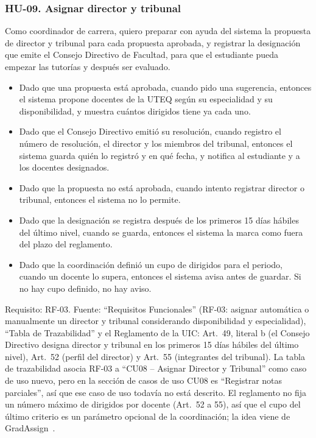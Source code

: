 \subsubsection*{HU-09. Asignar director y tribunal}
Como coordinador de carrera, quiero preparar con ayuda del sistema la propuesta de director y tribunal para cada propuesta aprobada, y registrar la designación que emite el Consejo Directivo de Facultad, para que el estudiante pueda empezar las tutorías y después ser evaluado.
\begin{itemize}
  \item Dado que una propuesta está aprobada, cuando pido una sugerencia, entonces el sistema propone docentes de la UTEQ según su especialidad y su disponibilidad, y muestra cuántos dirigidos tiene ya cada uno.
  \item Dado que el Consejo Directivo emitió su resolución, cuando registro el número de resolución, el director y los miembros del tribunal, entonces el sistema guarda quién lo registró y en qué fecha, y notifica al estudiante y a los docentes designados.
  \item Dado que la propuesta no está aprobada, cuando intento registrar director o tribunal, entonces el sistema no lo permite.
  \item Dado que la designación se registra después de los primeros 15 días hábiles del último nivel, cuando se guarda, entonces el sistema la marca como fuera del plazo del reglamento.
  \item Dado que la coordinación definió un cupo de dirigidos para el periodo, cuando un docente lo supera, entonces el sistema avisa antes de guardar. Si no hay cupo definido, no hay aviso.
\end{itemize}
Requisito: RF-03. Fuente: \enquote{Requisitos Funcionales} (RF-03: asignar automática o manualmente un director y tribunal considerando disponibilidad y especialidad), \enquote{Tabla de Trazabilidad} y el Reglamento de la UIC: Art.~49, literal b (el Consejo Directivo designa director y tribunal en los primeros 15 días hábiles del último nivel), Art.~52 (perfil del director) y Art.~55 (integrantes del tribunal). La tabla de trazabilidad asocia RF-03 a \enquote{CU08 -- Asignar Director y Tribunal} como caso de uso nuevo, pero en la sección de casos de uso CU08 es \enquote{Registrar notas parciales}, así que ese caso de uso todavía no está descrito. El reglamento no fija un número máximo de dirigidos por docente (Art.~52 a 55), así que el cupo del último criterio es un parámetro opcional de la coordinación; la idea viene de GradAssign~\cite{grzelak2026gradassign}.

